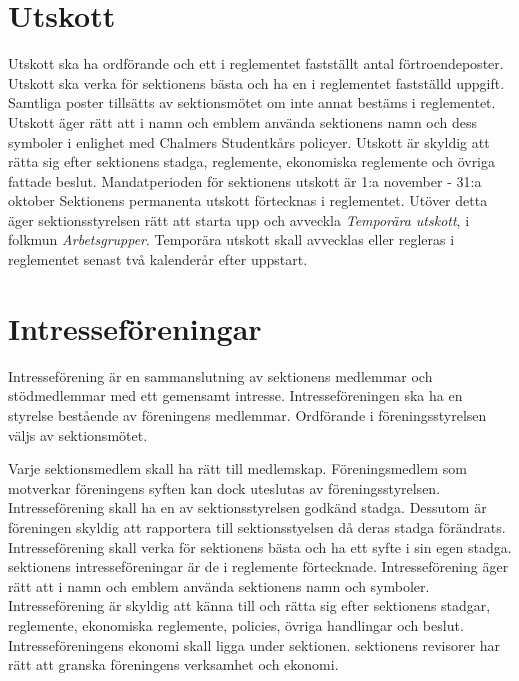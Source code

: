 \documentclass[a4paper]{dteklag}
\begin{document}
\section{Utskott}
\para Utskott ska ha ordförande och ett i reglementet fastställt antal förtroendeposter.
\para Utskott ska verka för sektionens bästa och ha en i reglementet fastställd uppgift.
\para Samtliga poster tillsätts av sektionsmötet om inte annat bestäms i reglementet. 
\para Utskott äger rätt att i namn och emblem använda sektionens namn och dess symboler i enlighet med Chalmers Studentkårs policyer.
\para Utskott är skyldig att rätta sig efter sektionens stadga, reglemente, ekonomiska reglemente och övriga fattade beslut.
\para Mandatperioden för sektionens utskott är 1:a november - 31:a oktober
\para Sektionens permanenta utskott förtecknas i reglementet.
 Utöver detta äger sektionsstyrelsen rätt att starta upp och avveckla \textit{Temporära utskott}, i folkmun \textit{Arbetsgrupper}.
\para Temporära utskott skall avvecklas eller regleras i reglementet senast två kalenderår efter uppstart.


\section{Intresseföreningar}
\para[Definition]
Intresseförening är en sammanslutning av sektionens medlemmar och stödmedlemmar med ett gemensamt intresse. Intresseföreningen ska ha en styrelse bestående av föreningens medlemmar. Ordförande i föreningsstyrelsen väljs av sektionsmötet.

\para Varje sektionsmedlem skall ha rätt till medlemskap. Föreningsmedlem som motverkar föreningens syften kan dock uteslutas av föreningsstyrelsen.
\para[Syfte] Intresseförening skall ha en av sektionsstyrelsen godkänd stadga. Dessutom är föreningen skyldig att rapportera till sektionsstyelsen då deras stadga förändrats.
\para Intresseförening skall verka för sektionens bästa och ha ett syfte i sin egen stadga.
\para sektionens intresseföreningar är de i reglemente förtecknade.
\para[Rättigheter]Intresseförening äger rätt att i namn och emblem använda sektionens namn och symboler.
\para[Skyldigheter] Intresseförening är skyldig att känna till och rätta sig efter sektionens stadgar, reglemente, ekonomiska reglemente, policies, övriga handlingar och beslut.
\para[Ekonomi] Intresseföreningens ekonomi skall ligga under sektionen.
\para sektionens revisorer har rätt att granska föreningens verksamhet och ekonomi. 
\end{document}

